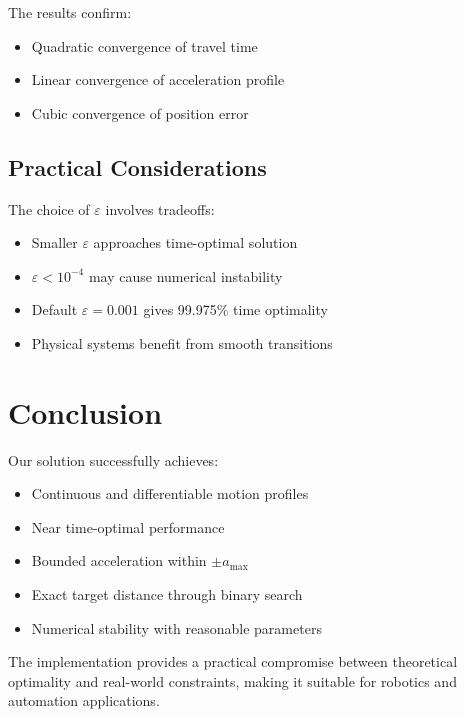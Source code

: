 \documentclass[12pt,a4paper]{article}
\begin{document}
The results confirm:
\begin{itemize}
\item Quadratic convergence of travel time
\item Linear convergence of acceleration profile
\item Cubic convergence of position error
\end{itemize}

\subsection{Practical Considerations}
The choice of $\varepsilon$ involves tradeoffs:
\begin{itemize}
\item Smaller $\varepsilon$ approaches time-optimal solution
\item $\varepsilon < 10^{-4}$ may cause numerical instability
\item Default $\varepsilon=0.001$ gives 99.975\% time optimality
\item Physical systems benefit from smooth transitions
\end{itemize}

\section{Conclusion}
Our solution successfully achieves:
\begin{itemize}
\item Continuous and differentiable motion profiles
\item Near time-optimal performance
\item Bounded acceleration within $\pm a_{\text{max}}$
\item Exact target distance through binary search
\item Numerical stability with reasonable parameters
\end{itemize}

The implementation provides a practical compromise between theoretical optimality and real-world constraints, making it suitable for robotics and automation applications.
\end{document}
